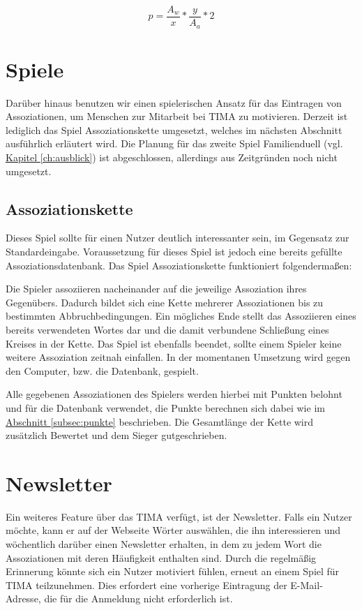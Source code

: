 \begin{equation}\label{eq:score}
p = \frac{A_w}{x} * \frac{y}{A_a} * 2
\end{equation}

\section{Spiele}\label{sec:games}
Darüber hinaus benutzen wir einen spielerischen Ansatz für das Eintragen von Assoziationen, um Menschen zur Mitarbeit bei TIMA zu motivieren. Derzeit ist lediglich das Spiel Assoziationskette umgesetzt, welches im nächsten Abschnitt ausführlich erläutert wird. Die Planung für das zweite Spiel Familienduell (vgl. \hyperref[ch:ausblick]{Kapitel \ref*{ch:ausblick}}) ist abgeschlossen, allerdings aus Zeitgründen noch nicht umgesetzt.

\subsection{Assoziationskette}
Dieses Spiel sollte für einen Nutzer deutlich interessanter sein, im Gegensatz zur Standardeingabe. Voraussetzung für dieses Spiel ist jedoch eine bereits gefüllte
Assoziationsdatenbank. Das Spiel Assoziationskette funktioniert folgendermaßen:

Die Spieler assoziieren nacheinander auf die jeweilige Assoziation ihres
Gegenübers. Dadurch bildet sich eine Kette mehrerer Assoziationen bis
zu bestimmten Abbruchbedingungen. Ein mögliches Ende stellt das Assoziieren
eines bereits verwendeten Wortes dar und die damit verbundene Schließung eines
Kreises in der Kette. Das Spiel ist ebenfalls beendet, sollte einem Spieler
keine weitere Assoziation zeitnah einfallen. In der momentanen Umsetzung wird gegen den Computer, bzw. die Datenbank, gespielt.

Alle gegebenen Assoziationen des Spielers werden hierbei mit Punkten belohnt
und für die Datenbank verwendet, die Punkte berechnen sich dabei wie im \hyperref[subsec:punkte]{Abschnitt \ref*{subsec:punkte}} beschrieben. Die Gesamtlänge der Kette wird zusätzlich Bewertet und dem Sieger gutgeschrieben.

\section{Newsletter}\label{subsec:newsletter}
Ein weiteres Feature über das TIMA verfügt, ist der Newsletter. Falls ein
Nutzer möchte, kann er auf der Webseite Wörter auswählen, die ihn
interessieren und wöchentlich darüber einen Newsletter erhalten, in dem zu
jedem Wort die Assoziationen mit deren Häufigkeit enthalten sind. Durch die
regelmäßig Erinnerung könnte sich ein Nutzer motiviert fühlen, erneut an einem
Spiel für TIMA teilzunehmen. Dies erfordert eine vorherige Eintragung der E-Mail-Adresse, die für die Anmeldung nicht erforderlich ist.

